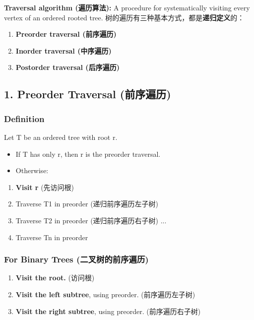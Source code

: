 \documentclass[10pt,a4paper,openany]{ctexbook}
\theoremstyle{definition}
\theoremstyle{remark}
\begin{document}
\textbf{Traversal algorithm (遍历算法):} A procedure for systematically visiting every vertex of an ordered rooted tree.
树的遍历有三种基本方式，都是\textbf{递归定义}的：
\begin{enumerate}
\item \textbf{Preorder traversal (前序遍历)}
\item \textbf{Inorder traversal (中序遍历)}
\item \textbf{Postorder traversal (后序遍历)}

\end{enumerate}

\vspace{-2pt}

\subsection{1. Preorder Traversal (前序遍历)}

\subsubsection{Definition}

Let T be an ordered tree with root r.
\begin{itemize}
\item If T has only r, then r is the preorder traversal.
\item Otherwise:
\end{itemize}

\begin{enumerate}
\item \textbf{Visit r} (先访问根)
\item Traverse T1 in preorder (递归前序遍历左子树)
\item Traverse T2 in preorder (递归前序遍历右子树)
...

\item Traverse Tn in preorder

\end{enumerate}

\subsubsection{For Binary Trees (二叉树的前序遍历)}

\begin{enumerate}
\item \textbf{Visit the root.} (访问根)
\item \textbf{Visit the left subtree}, using preorder. (前序遍历左子树)
\item \textbf{Visit the right subtree}, using preorder. (前序遍历右子树)

\end{enumerate}
\end{document}
